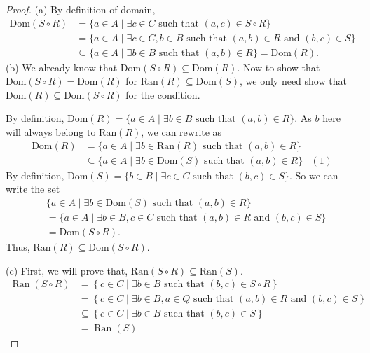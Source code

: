 \documentclass[12pt]{article}
\newcommand{\nd}{\text{ and }}
\begin{document}
\begin{proof}
	(a) By definition of domain,
	\begin{align*}
		\text{Dom}(S\circ R) &= \{a\in A \mid \exists c \in C \text{ such that } (a,c)\in S\circ R\} \\
		&= \{a\in A\mid \exists c \in C, b\in B \text{ such that } (a,b)\in R \nd (b,c)\in S\} \\
		&\subseteq \{a\in A\mid \exists b\in B \text{ such that } (a,b)\in R\}=\text{Dom}(R).
	\end{align*}
	(b) We already know that $\text{Dom}(S\circ R) \subseteq \text{Dom}(R)$. Now to show that $\text{Dom}(S\circ R)=\text{Dom}(R)$ for $\text{Ran}(R)\subseteq \text{Dom}(S)$, we only need show that $\text{Dom}(R)\subseteq \text{Dom}(S\circ R)$ for the condition.
	
	By definition, $\text{Dom}(R)=\{a\in A\mid \exists b\in B \text{ such that } (a,b)\in R\}$. As $b$ here will always belong to $\text{Ran}(R)$, we can rewrite as
	\begin{align*}
		\text{Dom}(R)&=\{a\in A\mid \exists b \in \text{Ran}(R) \text{ such that } (a,b)\in R\} &\\
		& \subseteq \{a\in A\mid \exists b \in \text{Dom}(S) \text{ such that } (a,b)\in R\} & (1)
	\end{align*}
	By definition, $\text{Dom}(S)=\{b\in B\mid \exists c\in C \text{ such that } (b,c)\in S\}$. So we can write the set
	\begin{align*}
		& \{a\in A\mid \exists b \in \text{Dom}(S) \text{ such that } (a,b)\in R\} \\
		&= \{a\in A\mid \exists b\in B, c\in C \text{ such that } (a,b)\in R \nd (b,c)\in S\} \\
		&= \text{Dom}(S\circ R).
	\end{align*}
	Thus, $\text{Ran}(R)\subseteq \text{Dom}(S\circ R)$.

	(c) First, we will prove that, $\text{Ran}(S\circ R)\subseteq \text{Ran}(S)$. 
	\begin{align*}
		\operatorname{Ran}(S \circ R) &= \left\{ c \in C \mid \exists b \in B \text{ such that } (b, c) \in S \circ R \right\} \\
		&= \left\{ c \in C \mid \exists b \in B, a \in Q \text{ such that } (a, b) \in R \text{ and } (b, c) \in S \right\} \\
		&\subseteq  \left\{ c \in C \mid \exists b \in B \text{ such that } (b, c) \in S \right\} \\
		&= \operatorname{Ran}(S)
	\end{align*}
	

\end{proof}
\end{document}
